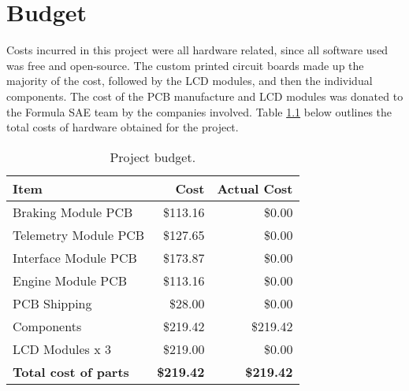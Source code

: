\chapter{Budget}

Costs incurred in this project were all hardware related, since all software used was free and open-source. The custom printed circuit boards made up the majority of the cost, followed by the LCD modules, and then the individual components. The cost of the PCB manufacture and LCD modules was donated to the Formula SAE team by the companies involved. Table \ref{tab:budget} below outlines the total costs of hardware obtained for the project.

    \begin{table}[H]
      \begin{centering}
	\caption{Project budget.}\label{tab:budget}
	\begin{tabular}{|l|r|r|}
	  \hline 
	  \textbf{Item} & \textbf{Cost} & \textbf{Actual Cost} \tabularnewline
	  \hline
	  \hline 
	  Braking Module PCB & \$113.16 & \$0.00 \tabularnewline
	  \hline 
	  Telemetry Module PCB & \$127.65 & \$0.00\tabularnewline
	  \hline 
	  Interface Module PCB & \$173.87 & \$0.00\tabularnewline
	  \hline 
	  Engine Module PCB & \$113.16 & \$0.00\tabularnewline
	  \hline 
	  PCB Shipping & \$28.00 & \$0.00\tabularnewline
	  \hline
	  Components & \$219.42 & \$219.42 \tabularnewline
	  \hline
	  LCD Modules x 3 & \$219.00 & \$0.00 \tabularnewline
	  \hline
	  \hline 
	  \textbf{Total cost of parts} & \textbf{\$219.42} & \textbf{\$219.42} \tabularnewline
	  \hline
	\end{tabular}
	\par
      \end{centering}
    \end{table}